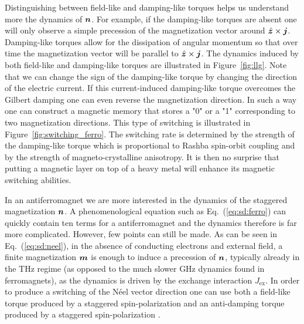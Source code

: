 Distinguishing between field-like and damping-like torques helps us understand more the dynamics of $\boldsymbol{n}$. For example, if the damping-like torques are absent one will only observe a simple precession of the magnetization vector around $\hat{\boldsymbol{z}}\times\boldsymbol{j}$. Damping-like torques allow for the dissipation of angular momentum so that over time the magnetization vector will be parallel to $\hat{\boldsymbol{z}}\times\boldsymbol{j}$. The dynamics induced by both field-like and damping-like torques are illustrated in Figure~\ref{fig:llg}. Note that we can change the sign of the damping-like torque by changing the direction of the electric current. If this current-induced damping-like torque overcomes the Gilbert damping one can even reverse the magnetization direction. In such a way one can construct a magnetic memory that stores a "0" or a "1" corresponding to two magnetization directions. This type of switching is illustrated in Figure~\ref{fig:switching_ferro}. The switching rate is determined by the strength of the damping-like torque which is proportional to Rashba spin-orbit coupling and by the strength of magneto-crystalline anisotropy. It is then no surprise that putting a magnetic layer on top of a heavy metal will enhance its magnetic switching abilities. 

In an antiferromagnet we are more interested in the dynamics of the staggered magnetization $\boldsymbol{n}$. A phenomenological equation such as Eq.~(\ref{eq:sd:ferro}) can quickly contain ten terms for a antiferromagnet and the dynamics therefore is far more complicated. However, few points can still be made. As can be seen in Eq.~(\ref{eq:sd:neel}), in the absence of conducting electrons and external field, a finite magnetization $\boldsymbol{m}$ is enough to induce a precession of $\boldsymbol{n}$, typically already in the THz regime (as opposed to the much slower GHz dynamics found in ferromagnets), as the dynamics is driven by the exchange interaction $J_\text{ex}$. In order to produce a switching of the N\'eel vector direction one can use both a field-like torque produced by a staggered spin-polarization and an anti-damping torque produced by a staggered spin-polarization \cite{fjaerbu_electrically_2017, cheng_terahertz_2016, khymyn_antiferromagnetic_2017}.

